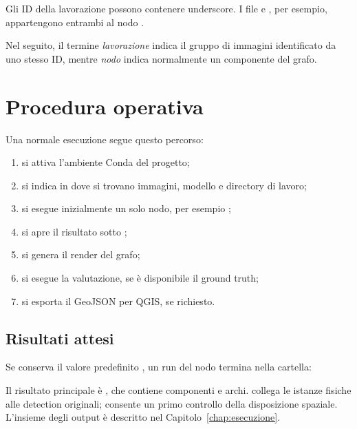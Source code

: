 Gli ID della lavorazione possono contenere underscore. I file
 e , per esempio, appartengono
entrambi al nodo .

Nel seguito, il termine \emph{lavorazione} indica il gruppo di immagini
identificato da uno stesso ID, mentre \emph{nodo} indica normalmente un
componente del grafo.

\section{Procedura operativa}

Una normale esecuzione segue questo percorso:

\begin{enumerate}
  \item si attiva l'ambiente Conda del progetto;
  \item si indica in  dove si trovano immagini, modello e
        directory di lavoro;
  \item si esegue inizialmente un solo nodo, per esempio
        ;
  \item si apre il risultato sotto
        ;
  \item si genera il render del grafo;
  \item si esegue la valutazione, se è disponibile il ground truth;
  \item si esporta il GeoJSON per QGIS, se richiesto.
\end{enumerate}

\subsection{Risultati attesi}

Se  conserva il valore predefinito , un run
del nodo  termina nella cartella:

\begin{center}
\end{center}

Il risultato principale è , che contiene componenti
e archi.  collega le istanze fisiche alle detection
originali;  consente un primo controllo della
disposizione spaziale. L'insieme degli output è descritto nel
Capitolo~\ref{chap:esecuzione}.

